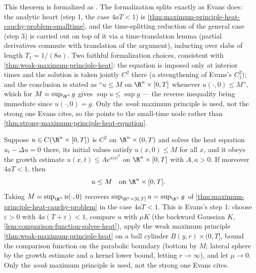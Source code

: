 This theorem is formalized as . The formalization
splits exactly as Evans does: the analytic heart (step 1, the case $4aT<1$) is
\cref{thm:maximum-principle-heat-cauchy-problem-smalltime}, and the time-splitting reduction
of the general case (step 3) is carried out on top of it via a time-translation lemma
(partial derivatives commute with translation of the argument), inducting over slabs of
length $T_1 = 1/(8a)$. Two faithful formalization choices, consistent with
\cref{thm:weak-maximum-principle-heat}: the equation is imposed only at interior times and
the solution is taken jointly $C^2$ there (a strengthening of Evans's $C^2_1$); and the
conclusion is stated as ``$u \le M$ on $\R^n\times[0,T]$ whenever $u(\cdot,0) \le M$'',
which for $M = \sup_{\R^n} g$ gives $\sup u \le \sup g$ — the reverse inequality being
immediate since $u(\cdot,0) = g$. Only the \emph{weak} maximum principle is used, not the
strong one Evans cites, so the \uses points to the small-time node rather than
\cref{thm:strong-maximum-principle-heat-equation}.

\begin{theorem}
\label{thm:maximum-principle-heat-cauchy-problem-smalltime}
\leanok
Suppose $u \in C(\R^n \times [0,T])$ is $C^2$ on $\R^n \times (0,T)$ and solves the heat
equation $u_t - \Delta u = 0$ there, its initial values satisfy $u(x,0) \le M$ for all $x$,
and it obeys the growth estimate $u(x,t) \le A e^{a|x|^2}$ on $\R^n \times [0,T]$ with
$A,a > 0$. If moreover $4aT < 1$, then
$$u \le M \quad \text{on } \R^n \times [0,T].$$
Taking $M = \sup_{\R^n} u(\cdot,0)$ recovers $\sup_{\R^n \times [0,T]} u = \sup_{\R^n} g$
of \cref{thm:maximum-principle-heat-cauchy-problem} in the case $4aT < 1$. This is Evans's
step 1: choose $\varepsilon > 0$ with $4a(T+\varepsilon) < 1$, compare $u$ with $\mu K$
(the backward Gaussian $K$, \cref{lem:comparison-function-solves-heat}), apply the weak
maximum principle \cref{thm:weak-maximum-principle-heat} on a ball cylinder $B(y,r) \times
(0,T]$, bound the comparison function on the parabolic boundary (bottom by $M$; lateral
sphere by the growth estimate and a kernel lower bound, letting $r \to \infty$), and let
$\mu \to 0$. Only the \emph{weak} maximum principle is used, not the strong one Evans
cites.
\end{theorem}

